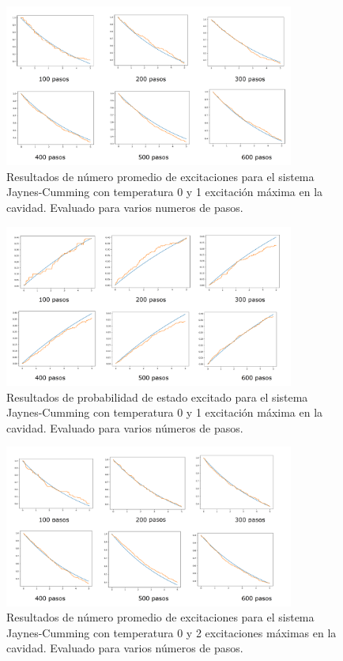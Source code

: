 \documentclass{book}
\begin{document}
\begin{figure}[ht]
    \includegraphics[width=0.85\textwidth]{test0_T0_pob0.png}
    \caption{Resultados de número promedio de excitaciones para el sistema Jaynes-Cumming con temperatura 0  y  1 excitación máxima en la cavidad. Evaluado para varios numeros de pasos.}
\end{figure}

\begin{figure}[ht]
    \includegraphics[width=0.85\textwidth]{test0_T0_pobe.png}
    \caption{Resultados de probabilidad de estado excitado para el sistema Jaynes-Cumming con temperatura 0 y 1 excitación máxima en la cavidad. Evaluado para varios números de pasos.}
\end{figure}

\begin{figure}[ht]
    \includegraphics[width=0.85\textwidth]{test1_T0_pob0.png}
    \caption{Resultados de número promedio de excitaciones para el sistema Jaynes-Cumming con temperatura 0 y  2 excitaciones máximas en la cavidad. Evaluado para varios números de pasos.}
\end{figure}
\end{document}
